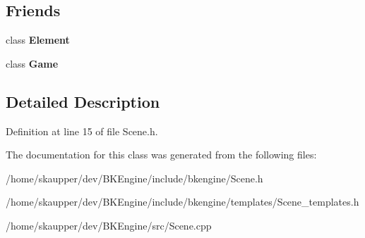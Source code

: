 \subsection*{Friends}
\begin{DoxyCompactItemize}
\item 
\mbox{\label{classbkengine_1_1Scene_a016b821f88c7c0a2de1451c175cefbf9}} 
class {\bfseries Element}
\item 
\mbox{\label{classbkengine_1_1Scene_aa2fab026580d6f14280c2ffb8063a314}} 
class {\bfseries Game}
\end{DoxyCompactItemize}


\subsection{Detailed Description}


Definition at line 15 of file Scene.\+h.



The documentation for this class was generated from the following files\+:\begin{DoxyCompactItemize}
\item 
/home/skaupper/dev/\+B\+K\+Engine/include/bkengine/Scene.\+h\item 
/home/skaupper/dev/\+B\+K\+Engine/include/bkengine/templates/Scene\+\_\+templates.\+h\item 
/home/skaupper/dev/\+B\+K\+Engine/src/Scene.\+cpp\end{DoxyCompactItemize}
